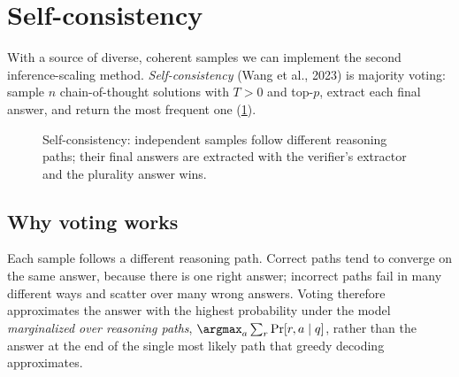 \section{Self-consistency}\label{sec:scaling:sc}

With a source of diverse, coherent samples we can implement the second inference-scaling method.
\emph{Self-consistency} (Wang et al., 2023) is majority voting: sample $n$ chain-of-thought
solutions with $T > 0$ and top-$p$, extract each final answer, and return the most frequent one
(\cref{fig:scaling:vote}).

\begin{figure}[t]
\centering
{}
\caption{Self-consistency: independent samples follow different reasoning paths; their final
answers are extracted with the verifier's extractor and the plurality answer wins.}
\label{fig:scaling:vote}
\end{figure}

\subsection{Why voting works}
Each sample follows a different reasoning path. Correct paths tend to converge on the same answer,
because there is one right answer; incorrect paths fail in many different ways and scatter over
many wrong answers. Voting therefore approximates the answer with the highest probability under the
model \emph{marginalized over reasoning paths}, $\argmax_a \sum_{r} \Pr[r, a \mid q]$, rather than
the answer at the end of the single most likely path that greedy decoding approximates.

